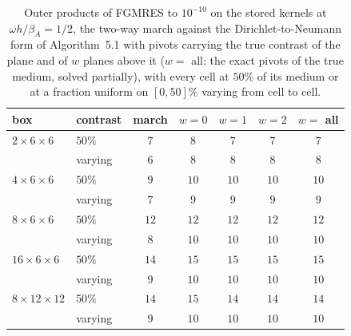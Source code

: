 \documentclass[11pt,a4paper]{article}
\begin{document}
\begin{table}[htbp]
\centering
\caption{Outer products of FGMRES to $10^{-10}$ on the stored kernels at $\omega h/\beta_A=1/2$, the two-way march
against the Dirichlet-to-Neumann form of Algorithm~5.1 with pivots carrying the true contrast of the plane and of
$w$ planes above it ($w=$ all: the exact pivots of the true medium, solved partially), with every cell at $50\%$
of its medium or at a fraction uniform on $[0,50]\%$ varying from cell to cell.}
\label{tab:dtnwindow}
\begin{tabular}{llccccc}
\toprule
box & contrast & march & $w=0$ & $w=1$ & $w=2$ & $w=$ all \\
\midrule
$2\times6\times6$ & $50\%$ & $7$ & $8$ & $7$ & $7$ & $7$ \\
 & varying & $6$ & $8$ & $8$ & $8$ & $8$ \\
$4\times6\times6$ & $50\%$ & $9$ & $10$ & $10$ & $10$ & $10$ \\
 & varying & $7$ & $9$ & $9$ & $9$ & $9$ \\
$8\times6\times6$ & $50\%$ & $12$ & $12$ & $12$ & $12$ & $12$ \\
 & varying & $8$ & $10$ & $10$ & $10$ & $10$ \\
$16\times6\times6$ & $50\%$ & $14$ & $15$ & $15$ & $15$ & $15$ \\
 & varying & $9$ & $10$ & $10$ & $10$ & $10$ \\
$8\times12\times12$ & $50\%$ & $14$ & $15$ & $14$ & $14$ & $14$ \\
 & varying & $9$ & $10$ & $10$ & $10$ & $10$ \\
\bottomrule
\end{tabular}
\end{table}
\end{document}
